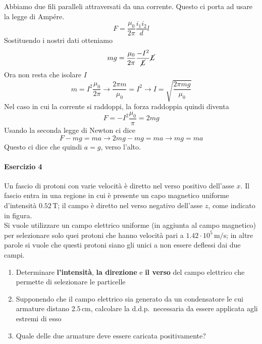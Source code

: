Abbiamo due fili paralleli attraversati da una corrente. Questo ci porta ad usare la legge di Ampére.
\begin{equation*}
  F = \frac{\mu_0}{2\pi}\frac{i_1i_2}{d}l
\end{equation*}
Sostituendo i nostri dati otteniamo
\begin{equation*}
  mg = \frac{\mu_0}{2\pi}\frac{-I^2}{\cancel{L}}\cancel{L}
\end{equation*}
Ora non resta che isolare $I$
\begin{equation*}
  m=I^2\frac{\mu_0}{2\pi} \rightarrow \frac{2\pi m}{\mu_0}=I^2 \rightarrow 
  \boxed{I = \sqrt{\frac{2\pi mg}{\mu_0}}}
\end{equation*}
Nel caso in cui la corrente si raddoppi, la forza raddoppia quindi diventa
\begin{equation*}
  F=-I^2\frac{\mu_0}{\pi}=2mg
\end{equation*}
Usando la seconda legge di Newton ci dice
\begin{equation*}
  F-mg=ma\rightarrow 2mg-mg = ma \rightarrow mg=ma
\end{equation*}
Questo ci dice che quindi $\boxed{a = g}$, verso l'alto.

\paragraph{Esercizio 4}
Un fascio di protoni con varie velocità è diretto nel verso positivo dell'asse $x$. Il fascio
entra in una regione in cui è presente un capo magnetico uniforme d'intensità $0.52\,\text{T}$;
il campo è diretto nel verso negativo dell'asse $z$, come indicato in figura.\\
Si vuole utilizzare un campo elettrico uniforme (in aggiunta al campo magnetico) per selezionare
solo quei protoni che hanno velocità pari a $1.42\cdot10^5\,\text{m/s}$; in altre parole si
vuole che questi protoni siano gli unici a non essere deflessi dai due campi.
\begin{enumerate}
  \item Determinare \textbf{l'intensità},  \textbf{la direzione} e \textbf{il verso} del campo
    elettrico che permette di selezionare le particelle
  \item Supponendo che il campo elettrico sia generato da un condensatore le cui armature distano
    $2.5\,\text{cm}$, calcolare la d.d.p.~necessaria da essere applicata agli estremi di esso
  \item Quale delle due armature deve essere caricata positivamente?
\end{enumerate}

